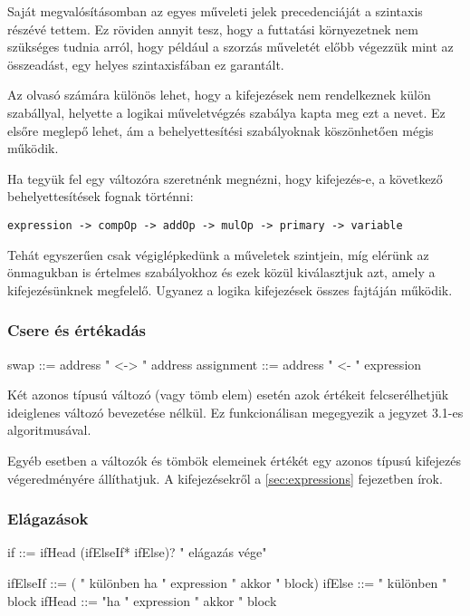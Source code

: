Saját megvalósításomban az egyes műveleti jelek precedenciáját a szintaxis részévé tettem. Ez röviden annyit tesz, hogy a futtatási környezetnek nem szükséges tudnia arról, hogy például a szorzás műveletét előbb végezzük mint az összeadást, egy helyes szintaxisfában ez garantált.

Az olvasó számára különös lehet, hogy a kifejezések nem rendelkeznek külön szabállyal, helyette a logikai műveletvégzés szabálya kapta meg ezt a nevet. Ez elsőre meglepő lehet, ám a behelyettesítési szabályoknak köszönhetően mégis működik.

Ha tegyük fel egy változóra szeretnénk megnézni, hogy kifejezés-e, a következő behelyettesítések fognak történni:

{\small \texttt{expression -> compOp -> addOp -> mulOp -> primary -> variable}\par}

Tehát egyszerűen csak végiglépkedünk a műveletek szintjein, míg elérünk az önmagukban is értelmes szabályokhoz és ezek közül kiválasztjuk azt, amely a kifejezésünknek megfelelő. Ugyanez a logika kifejezések összes fajtáján működik.

\subsubsection{Csere és értékadás}

\begin{ebnf}
swap ::= address " <-> " address
assignment ::= address " <- " expression
\end{ebnf}

Két azonos típusú változó (vagy tömb elem) esetén azok értékeit felcserélhetjük ideiglenes változó bevezetése nélkül. Ez funkcionálisan megegyezik a jegyzet\cite{jegyzet} 3.1-es algoritmusával.

Egyéb esetben a változók és tömbök elemeinek értékét egy azonos típusú kifejezés végeredményére állíthatjuk. A kifejezésekről a \ref{sec:expressions} fejezetben írok.

\subsubsection{Elágazások}

\begin{ebnf}
if ::= ifHead (ifElseIf* ifElse)? " elágazás vége"

ifElseIf ::= ( " különben ha " expression " akkor " block)
ifElse ::= " különben " block
ifHead ::= "ha " expression " akkor " block 
\end{ebnf}

